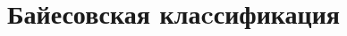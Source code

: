 \documentclass[compress,red,unicode]{beamer}
\begin{document}
\section{Байесовская клаcсификация}
\subsection{}


\end{document}
